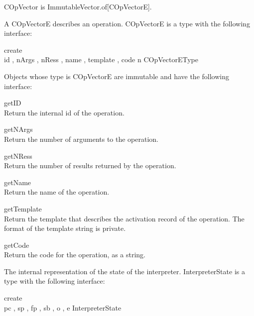 \label{builtin COpVector}
COpVector is ImmutableVector.of[COpVectorE].

\label{builtin COpVectorE}
A COpVectorE describes an operation.  COpVectorE is a type with
the following interface:

\begin{desc}
  \item[\kw{operation} create\/\LB{}]~\\
    id \CO{} ,
    nArgs \CO{} ,
    nRess \CO{} ,
    name \CO{} ,
    template \CO{} ,
    code \CO{} \/\RB{} \returns{} \/\LB{}n \CO{} COpVectorEType\/\RB{}
\end{desc}

Objects whose type is COpVectorE are immutable and have the following
interface:

\begin{desc}
  \item[\kw{function}  getID \returns{} \/\LB{}\tn{Integer}\/\RB{}]~\\
    Return the internal id of the operation.
  \item[\kw{function}  getNArgs \returns{} \/\LB{}\tn{Integer}\/\RB{}]~\\
    Return the number of arguments to the operation.
  \item[\kw{function}  getNRess \returns{} \/\LB{}\tn{Integer}\/\RB{}]~\\
    Return the number of results returned by the operation.
  \item[\kw{function}  getName \returns{} \/\LB{}\tn{String}\/\RB{}]~\\
    Return the name of the operation.
  \item[\kw{function}  getTemplate \returns{} \/\LB{}\tn{String}\/\RB{}]~\\
    Return the template that describes the activation record of the
    operation.  The format of the template string is private.
  \item[\kw{function}  getCode \returns{} \/\LB{}\tn{String}\/\RB{}]~\\
    Return the code for the operation, as a string.
\end{desc}

\label{builtin InterpreterState}
The internal representation of the state of the interpreter.
InterpreterState is a type with the following interface:

\begin{desc}
  \item[\kw{operation} create\/\LB{}]~\\
    pc \CO{} ,
    sp \CO{} ,
    fp \CO{} ,
    sb \CO{} ,
    o \CO{} ,
    e \CO{} \/\RB{}
  \returns{} \/\LB{}InterpreterState\/\RB{}
\end{desc}

